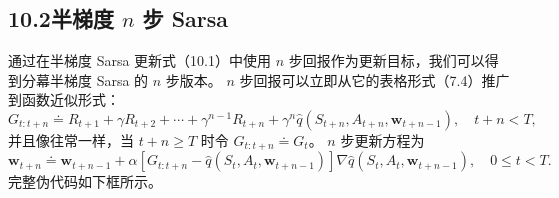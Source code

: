 \documentclass[UTF8, 12pt, fontset=fandol, oneside]{ctexart}
\begin{document}
\subsection*{10.2\quad 半梯度 $n$ 步 Sarsa}

通过在半梯度 Sarsa 更新式（10.1）中使用 $n$ 步回报作为更新目标，我们可以得到分幕半梯度 Sarsa 的 $n$ 步版本。
$n$ 步回报可以立即从它的表格形式（7.4）推广到函数近似形式：
\begin{equation}
G_{t:t+n}\doteq R_{t+1}+\gamma R_{t+2}+\cdots+\gamma^{n-1}R_{t+n}+\gamma^n\hat q(S_{t+n},A_{t+n},\mathbf{w}_{t+n-1}),\quad t+n<T,
\tag{10.4}
\end{equation}
并且像往常一样，当 $t+n\ge T$ 时令 $G_{t:t+n}\doteq G_t$。
$n$ 步更新方程为
\begin{equation}
\mathbf{w}_{t+n}\doteq \mathbf{w}_{t+n-1}+\alpha\left[G_{t:t+n}-\hat q(S_t,A_t,\mathbf{w}_{t+n-1})\right]\nabla\hat q(S_t,A_t,\mathbf{w}_{t+n-1}),\quad 0\le t<T.
\tag{10.5}
\end{equation}
完整伪代码如下框所示。
\end{document}
